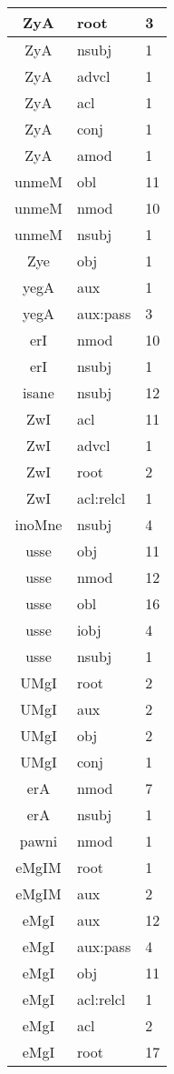 \documentclass[a4 paper]{article}
\begin{document}
\begin{longtable}{cp{}p{}}
ZyA & root & 3\\ \midrule ZyA & nsubj & 1\\ \midrule ZyA & advcl & 1\\ \midrule ZyA & acl & 1\\ \midrule ZyA & conj & 1\\ \midrule ZyA & amod & 1\\ \midrule 
unmeM & obl & 11\\ \midrule unmeM & nmod & 10\\ \midrule unmeM & nsubj & 1\\ \midrule 
Zye & obj & 1\\ \midrule 
yegA & aux & 1\\ \midrule yegA & aux:pass & 3\\ \midrule 
erI & nmod & 10\\ \midrule erI & nsubj & 1\\ \midrule 
isane & nsubj & 12\\ \midrule 
ZwI & acl & 11\\ \midrule ZwI & advcl & 1\\ \midrule ZwI & root & 2\\ \midrule ZwI & acl:relcl & 1\\ \midrule 
inoMne & nsubj & 4\\ \midrule 
usse & obj & 11\\ \midrule usse & nmod & 12\\ \midrule usse & obl & 16\\ \midrule usse & iobj & 4\\ \midrule usse & nsubj & 1\\ \midrule 
UMgI & root & 2\\ \midrule UMgI & aux & 2\\ \midrule UMgI & obj & 2\\ \midrule UMgI & conj & 1\\ \midrule 
erA & nmod & 7\\ \midrule erA & nsubj & 1\\ \midrule 
pawni & nmod & 1\\ \midrule 
eMgIM & root & 1\\ \midrule eMgIM & aux & 2\\ \midrule 
eMgI & aux & 12\\ \midrule eMgI & aux:pass & 4\\ \midrule eMgI & obj & 11\\ \midrule eMgI & acl:relcl & 1\\ \midrule eMgI & acl & 2\\ \midrule eMgI & root & 17\\ \midrule 

\end{longtable}
\end{document}
